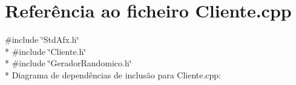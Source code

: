 \hypertarget{a00009}{\section{Referência ao ficheiro Cliente.\+cpp}
\label{a00009}
}
{\ttfamily \#include \char`\"{}Std\+Afx.\+h\char`\"{}}\\*
{\ttfamily \#include \char`\"{}Cliente.\+h\char`\"{}}\\*
{\ttfamily \#include \char`\"{}Gerador\+Randomico.\+h\char`\"{}}\\*
Diagrama de dependências de inclusão para Cliente.\+cpp\+:
